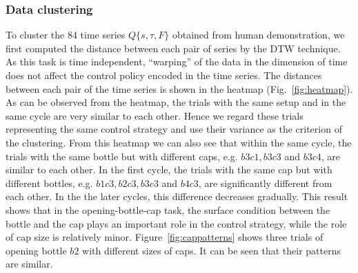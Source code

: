 \subsubsection{Data clustering}
To cluster the 84 time series $Q\{s,\tau,F\}$ obtained from human
demonstration, we first computed the distance between each pair of
series by the DTW technique. As this task is time independent,
``warping'' of the data in the dimension of time does not affect the
control policy encoded in the time series. The distances between each
pair of the time series is shown in the heatmap
(Fig.~\ref{fig:heatmap}). As can be observed from the heatmap, the
trials with the same setup and in the same cycle are very similar to
each other. Hence we regard these trials representing the same control
strategy and use their variance as the criterion of the
clustering. From this heatmap we can also see that within the same
cycle, the trials with the same bottle but with different caps,
e.g. $b3c1, b3c3$ and $b3c4$, are similar to each other. In the first
cycle, the trials with the same cap but with different bottles,
e.g. $b1c3, b2c3, b3c3$ and $b4c3$, are significantly different from
each other. In the the later cycles, this difference decreases
gradually. This result shows that in the opening-bottle-cap task, the
surface condition between the bottle and the cap plays an important
role in the control strategy, while the role of cap size is relatively
minor. Figure~\ref{fig:cappatterns} shows three trials of opening
bottle $b2$ with different sizes of caps. It can be seen that their
patterns are similar. 

